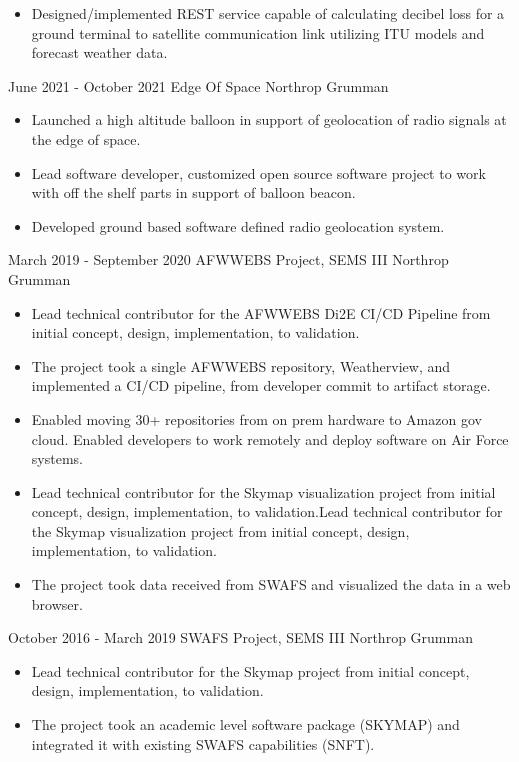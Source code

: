 \documentclass[]{src/friggeri-cv}
\begin{document}
\begin{entrylist}
{\begin{itemize}
        \item Designed/implemented REST service capable of calculating decibel loss for a ground terminal to satellite communication link utilizing ITU models and forecast weather data.
    \end{itemize}}
  \entry
    {June 2021 - October 2021}
    {Edge Of Space}
    {Northrop Grumman}
    {\begin{itemize}
        \item Launched a high altitude balloon in support of geolocation of radio signals at the edge of space.
        \item Lead software developer, customized open source software project to work with off the shelf parts in support of balloon beacon.
        \item Developed ground based software defined radio geolocation system.
    \end{itemize}}
  \entry
    {March 2019 - September 2020}
    {AFWWEBS Project, SEMS III}
    {Northrop Grumman}
    {\begin{itemize}
        \item Lead technical contributor for the AFWWEBS Di2E CI/CD Pipeline from initial concept, design, implementation, to validation.
        \item The project took a single AFWWEBS repository, Weatherview, and implemented a CI/CD pipeline, from developer commit to artifact storage.
        \item Enabled moving 30+ repositories from on prem hardware to Amazon gov cloud. Enabled developers to work remotely and deploy software on Air Force systems.
        \item Lead technical contributor for the Skymap visualization project from initial concept, design, implementation, to validation.Lead technical contributor for the Skymap visualization project from initial concept, design, implementation, to validation.
        \item The project took data received from SWAFS and visualized the data in a web browser.
    \end{itemize}}
  \entry
    {October 2016 - March 2019}
    {SWAFS Project, SEMS III}
    {Northrop Grumman}
    {\begin{itemize}
        \item Lead technical contributor for the Skymap project from initial concept, design, implementation, to validation.
        \item The project took an academic level software package (SKYMAP) and integrated it with existing SWAFS capabilities (SNFT).
    \end{itemize}}
\end{entrylist}
\end{document}
